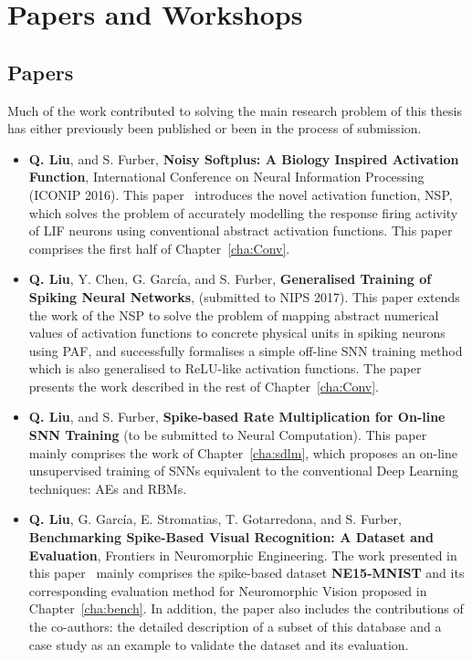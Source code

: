    
\section{Papers and Workshops}

\subsection{Papers}
	Much of the work contributed to solving the main research problem of this thesis has either previously been published or been in the process of submission.
\begin{itemize}

	\item 
	\textbf{Q. Liu}, and S. Furber, \textbf{Noisy Softplus: A Biology Inspired Activation Function}, International Conference on Neural Information Processing (ICONIP 2016). 
	This paper~\citep{liu2016noisy} introduces the novel activation function, NSP, 
	which solves the problem of accurately modelling the response firing activity of LIF neurons using conventional abstract activation functions.
	This paper comprises the first half of Chapter~\ref{cha:Conv}.
	
	\item 
	\textbf{Q. Liu}, Y. Chen, G. Garc\'ia, and S. Furber, \textbf{Generalised Training of Spiking Neural Networks}, (submitted to NIPS 2017).
	This paper extends the work of the NSP to solve the problem of mapping abstract numerical values of activation functions to concrete physical units in spiking neurons using PAF, and successfully formalises a simple off-line SNN training method which is also generalised to ReLU-like activation functions.
	The paper presents the work described in the rest of Chapter~\ref{cha:Conv}.
	
	
	\item 
	\textbf{Q. Liu}, and S. Furber, \textbf{Spike-based Rate Multiplication for On-line SNN Training} (to be submitted to Neural Computation).
	This paper mainly comprises the work of Chapter~\ref{cha:sdlm}, which proposes an on-line unsupervised training of SNNs equivalent to the conventional Deep Learning techniques: AEs and RBMs.
	
	\item 
	\textbf{Q. Liu}, G. Garc\'ia, E. Stromatias, T. Gotarredona, and S. Furber, \textbf{Benchmarking Spike-Based Visual Recognition: A Dataset and Evaluation}, Frontiers in Neuromorphic Engineering.
	The work presented in this paper~\citep{liu2016bench} mainly comprises the spike-based dataset \textbf{NE15-MNIST} and its corresponding evaluation method for Neuromorphic Vision proposed in Chapter~\ref{cha:bench}.
	In addition, the paper also includes the contributions of the co-authors: the detailed description of a subset of this database and a case study as an example to validate the dataset and its evaluation. 
	
\end{itemize}

